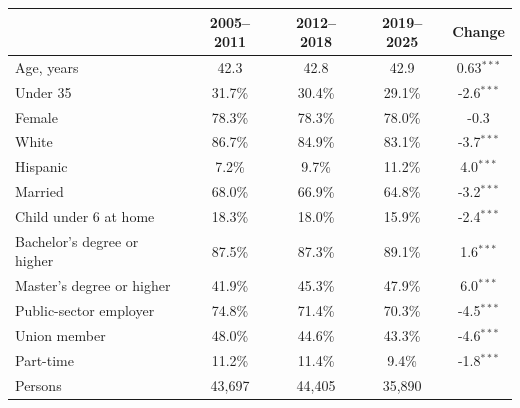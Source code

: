 \begin{tabular}{lcccc}
\toprule
 & 2005--2011 & 2012--2018 & 2019--2025 & Change \\
\midrule
Age, years & 42.3 & 42.8 & 42.9 & 0.63$^{***}$ \\
Under 35 & 31.7\% & 30.4\% & 29.1\% & -2.6$^{***}$ \\
Female & 78.3\% & 78.3\% & 78.0\% & -0.3 \\
White & 86.7\% & 84.9\% & 83.1\% & -3.7$^{***}$ \\
Hispanic & 7.2\% & 9.7\% & 11.2\% & 4.0$^{***}$ \\
Married & 68.0\% & 66.9\% & 64.8\% & -3.2$^{***}$ \\
Child under 6 at home & 18.3\% & 18.0\% & 15.9\% & -2.4$^{***}$ \\
Bachelor's degree or higher & 87.5\% & 87.3\% & 89.1\% & 1.6$^{***}$ \\
Master's degree or higher & 41.9\% & 45.3\% & 47.9\% & 6.0$^{***}$ \\
Public-sector employer & 74.8\% & 71.4\% & 70.3\% & -4.5$^{***}$ \\
Union member & 48.0\% & 44.6\% & 43.3\% & -4.6$^{***}$ \\
Part-time & 11.2\% & 11.4\% & 9.4\% & -1.8$^{***}$ \\
\midrule
Persons & 43,697 & 44,405 & 35,890 & \\
\bottomrule
\end{tabular}
